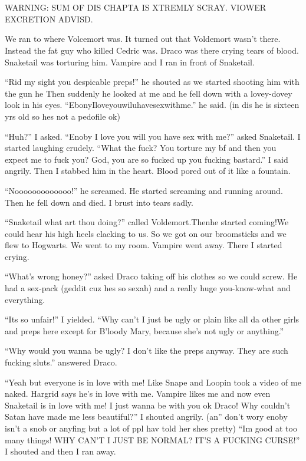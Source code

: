 \section{}



WARNING: SUM OF DIS CHAP\-TA IS XTREM\-LY
\linebreak SCRAY\@. VIOWER EX\-CRE\-TION ADVISD.

We ran to where Volcemort was. It turned out that Voldemort wasn't there. Instead the fat guy who killed Cedric was. Draco was there crying tears of blood. Snaketail was torturing him. Vampire and I ran in front of Snaketail.

\enquote{Rid my sight you despicable preps!} he shouted as we started shooting him with the gun he Then suddenly he looked at me and he fell down with a lovey-dovey look in his eyes. \enquote{EbonyIloveyouwiluhavesexwithme.} he said. (in dis he is sixteen yrs old so hes not a pedofile ok)

\enquote{Huh?} I asked.
\enquote{Enoby I love you will you have sex with me?} asked Snaketail. I started laughing crudely. \enquote{What the fuck? You torture my bf and then you expect me to fuck you? God, you are so fucked up you fucking bastard.} I said angrily. Then I stabbed him in the heart. Blood pored out of it like a fountain.

\enquote{Nooooooooooooo!} he screamed. He started screaming and running around. Then he fell down and died. I brust into tears sadly.

\enquote{Snaketail what art thou doing?} called Voldemort.\linebreak Then\dotfill he started coming!\newline We could hear his high heels clacking to us. So we got on our broomsticks and we flew to Hogwarts. We went to my room. Vampire went away. There I started crying.

\enquote{What's wrong honey?} asked Draco taking off his clothes so we could screw. He had a sex-pack (geddit cuz hes so sexah) and a really huge you-know-what and everything.

\enquote{Its so unfair!} I yielded. \enquote{Why can't I just be ugly or plain like all da other girls and preps here except for B'loody Mary, because she's not ugly or anything.}

\enquote{Why would you wanna be ugly? I don't like the preps anyway. They are such fucking sluts.} answered Draco.

\enquote{Yeah but everyone is in love with me! Like Snape and Loopin took a video of me naked. Hargrid says he's in love with me. Vampire likes me and now even Snaketail is in love with me! I just wanna be with you ok Draco! Why couldn't Satan have made me less beautiful?} I shouted angrily. (an'' don't wory enoby isn't a snob or anyfing but a lot of ppl hav told her shes pretty) \enquote{Im good at too many things! WHY CAN'T I JUST BE NORMAL\@? IT'S A FUCKING CURSE\@!} I shouted and then I ran away.
